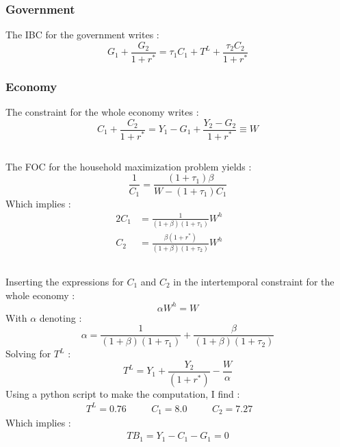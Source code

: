 \documentclass{article}
\begin{document}
\subsubsection*{Government}
The IBC for the government writes :
\begin{equation}
    G_1 + \frac{G_2}{1+r^*} = \tau_1 C_1 + T^L + \frac{\tau_2 C_2}{1+r^*}
\end{equation}
\subsubsection*{Economy}
The constraint for the whole economy writes :
\begin{equation}
    C_1 + \frac{C_2}{1+r^*} = Y_1 - G_1 + \frac{Y_2 - G_2}{1+r^*} \equiv W
\end{equation}
\subsection{}
The FOC for the household maximization problem yields :
\begin{equation}
    \frac{1}{C_1} = \frac{(1 + \tau_1)\beta}{W - (1 + \tau_1)C_1}
\end{equation}
Which implies :
\begin{alignat}{2}
    C_1 &= \frac{1}{(1+\beta)(1+\tau_1)}W^h &\quad\\
    C_2 &= \frac{\beta(1+r^*)}{(1+\beta)(1+\tau_2)}W^h &\quad 
\end{alignat}
\subsection{}
Inserting the expressions for $C_1$ and $C_2$ in the intertemporal constraint for the whole economy :
\begin{equation}
    \alpha W^h = W
\end{equation}
With $\alpha$ denoting :
\begin{equation}
    \alpha = \frac{1}{(1+\beta)(1+\tau_1)} + \frac{\beta}{(1+\beta)(1+\tau_2)}
\end{equation}
Solving for $T^L$ :
\begin{equation}
    T^L = Y_1 + \frac{Y_2}{(1+r^*)} - \frac{W}{\alpha}
\end{equation}
Using a python script to make the computation, I find :
\begin{align*}
    T^L = 0.76  && \quad
    C_1 = 8.0 &&\quad
    C_2 = 7.27 &\quad 
\end{align*}
Which implies :
\begin{align*}
    TB_1 = Y_1 - C_1 - G_1 = 0 
\end{align*}
\end{document}
